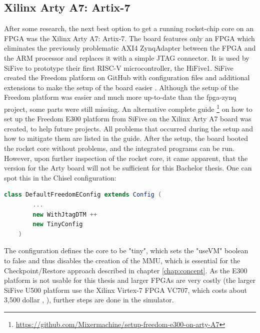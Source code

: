 \subsection{Xilinx Arty A7: Artix-7}
After some research, the next best option to get a running rocket-chip
core on an FPGA was the Xilinx Arty A7: Artix-7.
The board features only an FPGA which eliminates the previously problematic
AXI4 ZynqAdapter between the FPGA and the ARM processor and replaces it
with a simple JTAG connector.
It is used by SiFive to prototype their first RISC-V microcontroller, the HiFive1.
SiFive created the Freedom platform on GitHub with configuration files
and additional extensions to make the setup of the board
easier \cite{github_freedom}.
Although the setup of the Freedom platform was easier and much more
up-to-date than the fpga-zynq project, some parts were still missing.
An alternative complete guide 
\footnote{\url{https://github.com/Mixermachine/setup-freedom-e300-on-arty-A7}}
on how to set up the Freedom E300 platform from SiFive on the
Xilinx Arty A7 board was created, to help future projects.
All problems that occurred during
the setup and how to mitigate them are listed in the guide.
After the setup, the board booted the rocket core without problems,
and the integrated programs can be run.
However, upon further inspection of the rocket core, it came apparent,
that the version for the Arty board will not be sufficient for this
Bachelor thesis. One can spot this in the Chisel configuration:
\begin{lstlisting}[language=scala, frame=single]
    class DefaultFreedomEConfig extends Config (
        ...
        new WithJtagDTM ++
        new TinyConfig
    )
\end{lstlisting}
The configuration defines the core to be "tiny", which sets the "useVM" boolean
to false and thus disables the creation of the MMU, which is essential
for the Checkpoint/Restore approach described in chapter \ref{chap:concept}.
As the E300 platform is not usable for this thesis and larger FPGAs are
very costly (the larger SiFive U500 platform use the Xilinx Virtex-7 FPGA
VC707, which costs about 3,500 dollar \cite{github_freedom},
\cite{xilinx_virtex7}), further steps are done in the simulator.


